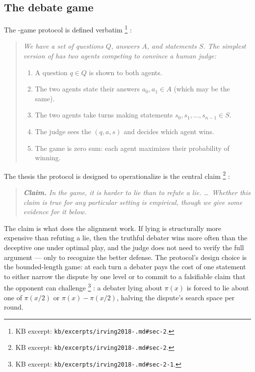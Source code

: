 \subsection{The debate game}
\label{sec:oversight-debate-game}

The -game protocol is defined verbatim%
\footnote{KB excerpt: \texttt{kb/excerpts/irving2018-.md\#sec-2}.}
\citep[\S 2]{irving2018-debate}:

\begin{quote}\itshape
We have a set of questions $Q$, answers $A$, and  statements $S$.
The simplest version of  has two agents competing to convince a
human judge:
\begin{enumerate}
\item A question $q \in Q$ is shown to both agents.
\item The two agents state their answers $a_0, a_1 \in A$ (which may
be the same).
\item The two agents take turns making statements
$s_0, s_1, \ldots, s_{n-1} \in S$.
\item The judge sees the  $(q, a, s)$ and decides which agent
wins.
\item The game is zero sum: each agent maximizes their probability of
winning.
\end{enumerate}
\end{quote}

The thesis the protocol is designed to operationalize is the central
claim%
\footnote{KB excerpt: \texttt{kb/excerpts/irving2018-.md\#sec-2}.}
\citep[\S 2, central claim]{irving2018-debate}:

\begin{quote}\itshape
\textbf{Claim.} In the  game, it is harder to lie than to refute
a lie. \ldots\ Whether this claim is true for any particular setting
is empirical, though we give some evidence for it below.
\end{quote}

The claim is what does the alignment work. If lying is structurally
more expensive than refuting a lie, then the truthful debater wins more
often than the deceptive one under optimal play, and the judge does
not need to verify the full argument --- only to recognize the better
defense. The protocol's design choice is the bounded-length game: at
each turn a debater pays the cost of one statement to either narrow
the dispute by one level or to commit to a falsifiable claim that the
opponent can challenge%
\footnote{KB excerpt: \texttt{kb/excerpts/irving2018-.md\#sec-2-1}.}
\citep[\S 2.1, prime-counting recursion]{irving2018-debate}: a
debater lying about $\pi(x)$ is forced to lie about one of $\pi(x/2)$
or $\pi(x) - \pi(x/2)$, halving the dispute's search space per round.

